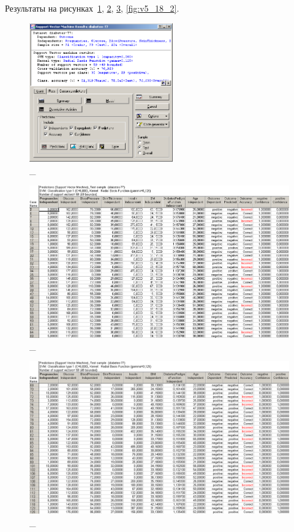 Результаты на рисунках~\ref{fig:v5_16}, \ref{fig:v5_17}, \ref{fig:v5_18}, \ref{fig:v5_18_2}.

\begin{figure}[!h]
  \centering

  \includegraphics[height=6cm]
  {inc/v5_16.PNG}

  \caption{\_}

  \label{fig:v5_16}
\end{figure}

\begin{figure}[!hp]
  \centering

  \includegraphics[width=14cm]
  {inc/v5_17.PNG}

  \caption{\_}

  \label{fig:v5_17}
\end{figure}

\begin{figure}[!hp]
  \centering

  \includegraphics[width=14cm]
  {inc/v5_18.PNG}

  \caption{\_}

  \label{fig:v5_18}
\end{figure}

